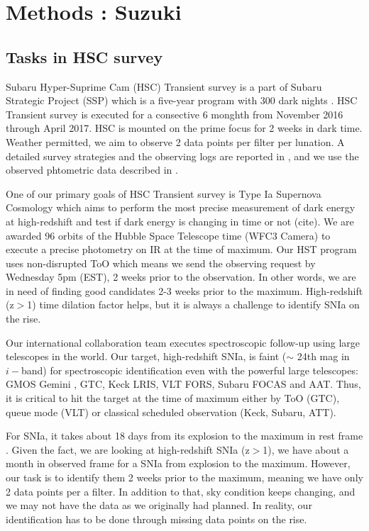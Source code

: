 \documentclass[useamsfonts]{pasj01}
\begin{document}
\section{Methods : Suzuki}
\subsection{Tasks in HSC survey}
\label{sec:tasks}
Subaru Hyper-Suprime Cam (HSC) Transient survey is a part of Subaru Strategic Project (SSP) which is a five-year program with 300 dark nights \citep{aihara18a,miyazaki18a}.
HSC Transient survey is executed for a consective 6 monghth from November 2016 through April 2017.
HSC is mounted on the prime focus for 2 weeks in dark time.   
Weather permitted, we aim to observe 2 data points per filter per lunation.
A detailed survey strategies and the observing logs are reported in \citet{yasuda19a}, and we use the observed phtometric data described in \citet{yasuda19a}.

One of our primary goals of HSC Transient survey is Type Ia Supernova Cosmology which aims to perform the most precise measurement of dark energy at high-redshift and test if dark energy is changing in time or not (cite).
We are awarded 96 orbits of the Hubble Space Telescope time (WFC3 Camera) to execute a precise photometry on IR at the time of maximum.
Our HST program uses non-disrupted ToO which means we send the observing request by Wednesday 5pm (EST), 2 weeks prior to the observation.
In other words, we are in need of finding good candidates 2-3 weeks prior to the maximum.  High-redshift (z$>$1) time dilation factor helps, but it is always a challenge to identify SNIa on the rise.

Our international collaboration team executes spectroscopic follow-up using large telescopes in the world.  
Our target, high-redshift SNIa, is faint ($\sim$ 24th mag in $i-$band) for spectroscopic identification even with the powerful large telescopes: GMOS Gemini \citep{hook04a}, GTC, Keck LRIS, VLT FORS, Subaru FOCAS \citep{kashikawa02a} and AAT.  
Thus, it is critical to hit the target at the time of maximum either by ToO (GTC), queue mode (VLT) or classical scheduled observation (Keck, Subaru, ATT).

For SNIa, it takes about 18 days from its explosion to the maximum in rest frame \citep{conley06a,papadogiannakis19a}.   Given the fact, we are looking at high-redshift SNIa (z$>$1), we have about a month in observed frame for a SNIa from explosion to the maximum.   However, our task is to identify them 2 weeks prior to the maximum, meaning we have only 2 data points per a filter.   In addition to that, sky condition keeps changing, and we may not have the data as we originally had planned.   In reality, our identification has to be done through missing data points on the rise.
\end{document}
